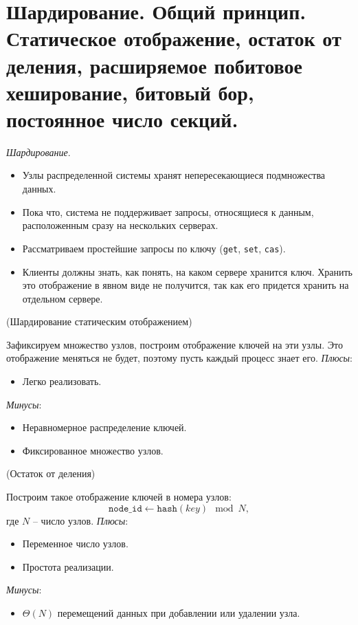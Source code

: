 \section{Шардирование. Общий принцип. Статическое отображение,
остаток от деления, расширяемое побитовое хеширование, битовый бор,
постоянное число секций.}

\begin{definition}
    \textit{Шардирование}.
    \begin{itemize}
        \item Узлы распределенной системы хранят непересекающиеся
            подмножества данных.
        \item Пока что, система не поддерживает запросы, относящиеся к данным,
            расположенным сразу на нескольких серверах.
        \item Рассматриваем простейшие запросы по ключу (\texttt{get}, \texttt{set},
            \texttt{cas}).
        \item Клиенты должны знать, как понять, на каком сервере хранится ключ.
            Хранить это отображение в явном виде не получится, так как его придется
            хранить на отдельном сервере.
    \end{itemize}
\end{definition}

\begin{algorithm}(Шардирование статическим отображением)

    Зафиксируем множество узлов, построим отображение ключей на эти узлы.
    Это отображение меняться не будет, поэтому пусть каждый процесс знает его.
    \textit{Плюсы}:
    \begin{itemize}
        \item Легко реализовать.
    \end{itemize}
    \textit{Минусы}:
    \begin{itemize}
        \item Неравномерное распределение ключей.
        \item Фиксированное множество узлов.
    \end{itemize}
\end{algorithm}

\begin{algorithm}(Остаток от деления)

    Построим такое отображение ключей в номера узлов:
    \[
        \texttt{node\_id} \leftarrow \texttt{hash}(key) \mod N
    ,\]
    где $N$ -- число узлов.
    \textit{Плюсы}:
    \begin{itemize}
        \item Переменное число узлов.
        \item Простота реализации.
    \end{itemize}
    \textit{Минусы}:
    \begin{itemize}
        \item $\Theta(N)$ перемещений данных при добавлении или удалении узла.
    \end{itemize}
\end{algorithm}

